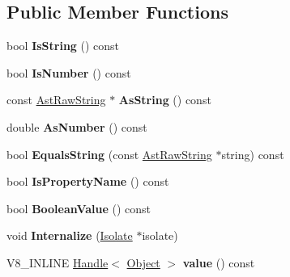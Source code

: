 \subsection*{Public Member Functions}
\begin{DoxyCompactItemize}
\item 
\hypertarget{classv8_1_1internal_1_1_ast_value_ab70bfc634e17e29db259a26a757a05c9}{}bool {\bfseries Is\+String} () const \label{classv8_1_1internal_1_1_ast_value_ab70bfc634e17e29db259a26a757a05c9}

\item 
\hypertarget{classv8_1_1internal_1_1_ast_value_a399b9f14cff4101983a3d2842d62c911}{}bool {\bfseries Is\+Number} () const \label{classv8_1_1internal_1_1_ast_value_a399b9f14cff4101983a3d2842d62c911}

\item 
\hypertarget{classv8_1_1internal_1_1_ast_value_a80e071eba4956e10a281194df8a8668d}{}const \hyperlink{classv8_1_1internal_1_1_ast_raw_string}{Ast\+Raw\+String} $\ast$ {\bfseries As\+String} () const \label{classv8_1_1internal_1_1_ast_value_a80e071eba4956e10a281194df8a8668d}

\item 
\hypertarget{classv8_1_1internal_1_1_ast_value_aa99e007e6191e0790578ed7addd4e182}{}double {\bfseries As\+Number} () const \label{classv8_1_1internal_1_1_ast_value_aa99e007e6191e0790578ed7addd4e182}

\item 
\hypertarget{classv8_1_1internal_1_1_ast_value_a57648a16dba0de8154a5a6690a556bf9}{}bool {\bfseries Equals\+String} (const \hyperlink{classv8_1_1internal_1_1_ast_raw_string}{Ast\+Raw\+String} $\ast$string) const \label{classv8_1_1internal_1_1_ast_value_a57648a16dba0de8154a5a6690a556bf9}

\item 
\hypertarget{classv8_1_1internal_1_1_ast_value_a42d04cc428b13f93d30262e298565a83}{}bool {\bfseries Is\+Property\+Name} () const \label{classv8_1_1internal_1_1_ast_value_a42d04cc428b13f93d30262e298565a83}

\item 
\hypertarget{classv8_1_1internal_1_1_ast_value_ab4be5ef2b7f23e682672333fed29f0f2}{}bool {\bfseries Boolean\+Value} () const \label{classv8_1_1internal_1_1_ast_value_ab4be5ef2b7f23e682672333fed29f0f2}

\item 
\hypertarget{classv8_1_1internal_1_1_ast_value_a71b8e2275ef7875e0ca7b48e4eaa2650}{}void {\bfseries Internalize} (\hyperlink{classv8_1_1internal_1_1_isolate}{Isolate} $\ast$isolate)\label{classv8_1_1internal_1_1_ast_value_a71b8e2275ef7875e0ca7b48e4eaa2650}

\item 
\hypertarget{classv8_1_1internal_1_1_ast_value_a2c1bb2b42997f4dbc59919f38e013e09}{}V8\+\_\+\+I\+N\+L\+I\+N\+E \hyperlink{classv8_1_1internal_1_1_handle}{Handle}$<$ \hyperlink{classv8_1_1internal_1_1_object}{Object} $>$ {\bfseries value} () const \label{classv8_1_1internal_1_1_ast_value_a2c1bb2b42997f4dbc59919f38e013e09}

\end{DoxyCompactItemize}
